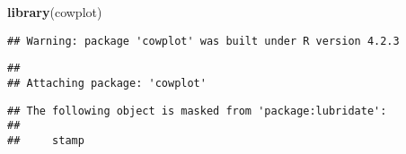 \documentclass[
]{article}
\newenvironment{Shaded}{\begin{snugshade}}{\end{snugshade}}
\newcommand{\FunctionTok}[1]{\textcolor[rgb]{0.13,0.29,0.53}{\textbf{#1}}}
\newcommand{\NormalTok}[1]{#1}
\begin{document}
\begin{Shaded}
\begin{Highlighting}[]
\FunctionTok{library}\NormalTok{(cowplot)}
\end{Highlighting}
\end{Shaded}

\begin{verbatim}
## Warning: package 'cowplot' was built under R version 4.2.3
\end{verbatim}

\begin{verbatim}
## 
## Attaching package: 'cowplot'
\end{verbatim}

\begin{verbatim}
## The following object is masked from 'package:lubridate':
## 
##     stamp
\end{verbatim}
\end{document}
